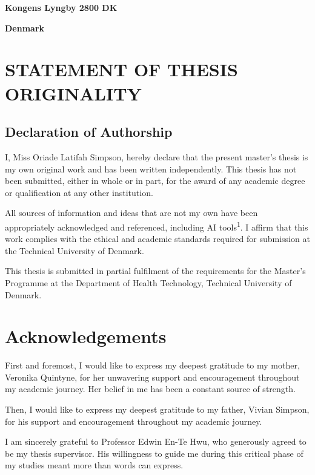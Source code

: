 \documentclass[
]{article}
\begin{document}
\textbf{Kongens Lyngby 2800 DK}

\textbf{Denmark}

\newpage

\section{STATEMENT OF THESIS
ORIGINALITY}\label{statement-of-thesis-originality}

\subsection{Declaration of Authorship}\label{declaration-of-authorship}

I, Miss Oriade Latifah Simpson, hereby declare that the present master's
thesis is my own original work and has been written independently. This
thesis has not been submitted, either in whole or in part, for the award
of any academic degree or qualification at any other institution.

All sources of information and ideas that are not my own have been
appropriately acknowledged and referenced, including AI
tools\textsuperscript{1}. I affirm that this work complies with the
ethical and academic standards required for submission at the Technical
University of Denmark.

This thesis is submitted in partial fulfilment of the requirements for
the Master's Programme at the Department of Health Technology, Technical
University of Denmark.

\newpage

\section{Acknowledgements}\label{acknowledgements}

First and foremost, I would like to express my deepest gratitude to my
mother, Veronika Quintyne, for her unwavering support and encouragement
throughout my academic journey. Her belief in me has been a constant
source of strength.

Then, I would like to express my deepest gratitude to my father, Vivian
Simpson, for his support and encouragement throughout my academic
journey.

I am sincerely grateful to Professor Edwin En-Te Hwu, who generously
agreed to be my thesis supervisor. His willingness to guide me during
this critical phase of my studies meant more than words can express.
\end{document}
